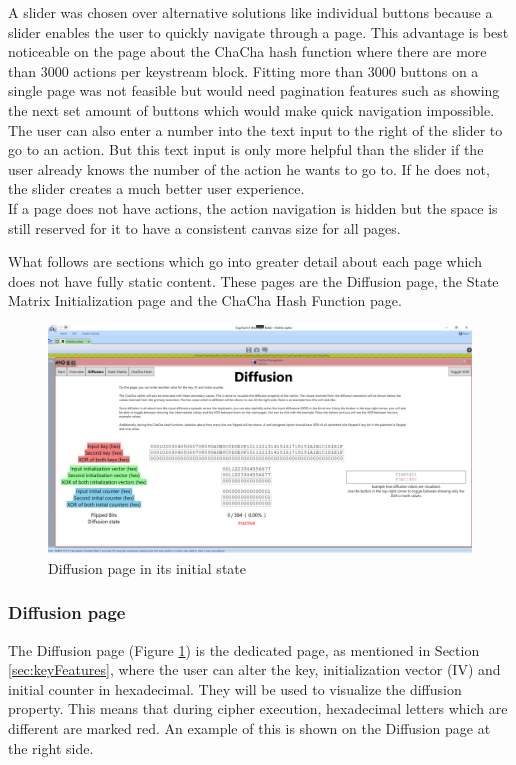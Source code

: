 A slider was chosen over alternative solutions like individual buttons because a slider enables the user to quickly navigate through a page. This advantage  is best noticeable on the page about the ChaCha hash function where there are more than 3000 actions per keystream block. Fitting more than 3000 buttons on a single page was not feasible but would need pagination features such as showing the next set amount of buttons which would make quick navigation impossible. \\
The user can also enter a  number into the text input to the right of the slider to go to an action. But this text input is only more helpful than the slider if the user already knows the number of the action he wants to go to. If he does not, the slider creates a much better user experience. \\
If a page does not have actions, the action navigation is hidden but the space is still reserved for it to have a consistent canvas size for all pages.

What follows are sections which go into greater detail about each page which does not have fully static content. These pages are the Diffusion page, the State Matrix Initialization page and the ChaCha Hash Function page.

\begin{figure}
\centering
\includegraphics[width=\textwidth]{figures/ct2/all-pages/3-diffusion.png}
\caption{Diffusion page in its initial state}
\label{fig:diffusionpage}
\end{figure}

\subsubsection{Diffusion page}

The Diffusion page (Figure \ref{fig:diffusionpage}) is the dedicated page, as mentioned in Section \ref{sec:keyFeatures}, where the user can alter the key, initialization vector (IV) and initial counter in hexadecimal. They will be used to visualize the diffusion property. This means that during cipher execution, hexadecimal letters which are different are marked red. An example of this is shown on the Diffusion page at the right side.

